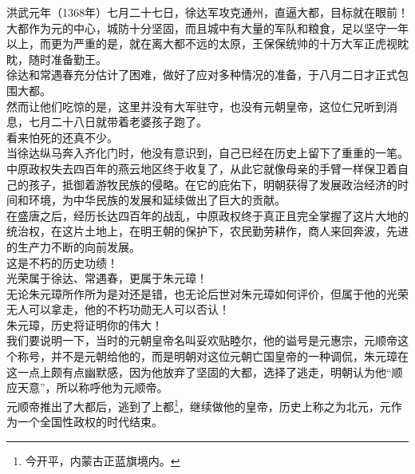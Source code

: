 \begin{multicols}{\theparacolNo}
洪武元年（1368年）七月二十七日，徐达军攻克通州，直逼大都，目标就在眼前！\\

大都作为元的中心，城防十分坚固，而且城中有大量的军队和粮食，足以坚守一年以上，而更为严重的是，就在离大都不远的太原，王保保统帅的十万大军正虎视眈眈，随时准备勤王。\\

徐达和常遇春充分估计了困难，做好了应对多种情况的准备，于八月二日才正式包围大都。\\

然而让他们吃惊的是，这里并没有大军驻守，也没有元朝皇帝，这位仁兄听到消息，七月二十八日就带着老婆孩子跑了。\\

看来怕死的还真不少。\\

当徐达纵马奔入齐化门时，他没有意识到，自己已经在历史上留下了重重的一笔。\\

中原政权失去四百年的燕云地区终于收复了，从此它就像母亲的手臂一样保卫着自己的孩子，抵御着游牧民族的侵略。在它的庇佑下，明朝获得了发展政治经济的时间和环境，为中华民族的发展和延续做出了巨大的贡献。\\

在盛唐之后，经历长达四百年的战乱，中原政权终于真正且完全掌握了这片大地的统治权，在这片土地上，在明王朝的保护下，农民勤劳耕作，商人来回奔波，先进的生产力不断的向前发展。\\

这是不朽的历史功绩！\\

光荣属于徐达、常遇春，更属于朱元璋！\\

无论朱元璋所作所为是对还是错，也无论后世对朱元璋如何评价，但属于他的光荣无人可以拿走，他的不朽功勋无人可以否认！\\

朱元璋，历史将证明你的伟大！\\

我们要说明一下，当时的元朝皇帝名叫妥欢贴睦尔，他的谥号是元惠宗，元顺帝这个称号，并不是元朝给他的，而是明朝对这位元朝亡国皇帝的一种调侃，朱元璋在这一点上颇有点幽默感，因为他放弃了坚固的大都，选择了逃走，明朝认为他“顺应天意”，所以称呼他为元顺帝。\\

元顺帝推出了大都后，逃到了上都\footnote{今开平，内蒙古正蓝旗境内。}，继续做他的皇帝，历史上称之为北元，元作为一个全国性政权的时代结束。\\


\end{multicols}
